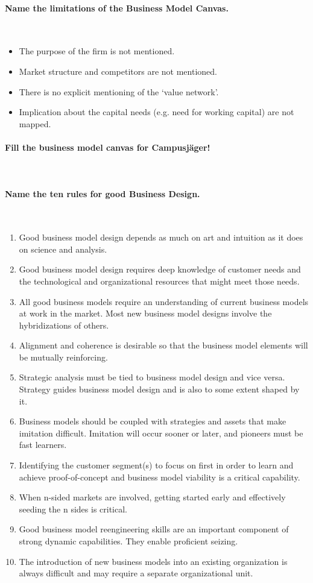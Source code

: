 \documentclass[10pt,a4paper,noendnumber=true]{scrartcl}
\newcommand{\properparagraph}[1]{\paragraph{\textcolor{Emerald}{#1}}\mbox{}\\}
\begin{document}
\properparagraph{Name the limitations of the Business Model Canvas.}
\begin{itemize}
	\item The purpose of the firm is not mentioned.
	\item Market structure and competitors are not mentioned.
	\item There is no explicit mentioning of the ‘value network’.
	\item Implication about the capital needs (e.g. need for working capital) are not mapped.
\end{itemize}

\properparagraph{Fill the business model canvas for Campusjäger!}

\properparagraph{Name the ten rules for good Business Design.}
\begin{enumerate}
	\item  Good business model design depends as much on art and intuition as it does on science
	and analysis.
	\item Good business model design requires deep knowledge of customer needs and the
	technological and organizational resources that might meet those needs.
	\item All good business models require an understanding of current business models at work in
	the market. Most new business model designs involve the hybridizations of others.
	\item Alignment and coherence is desirable so that the business model elements will be
	mutually reinforcing.
	\item Strategic analysis must be tied to business model design and vice versa. Strategy guides
	business model design and is also to some extent shaped by it.
	\item Business models should be coupled with strategies and assets that make imitation
	difficult. Imitation will occur sooner or later, and pioneers must be fast learners.
	\item Identifying the customer segment(s) to focus on first in order to learn and achieve
	proof-of-concept and business model viability is a critical capability.
	\item When n-sided markets are involved, getting started early and effectively seeding the
	n sides is critical.
	\item Good business model reengineering skills are an important component of strong
	dynamic capabilities. They enable proficient seizing.
	\item The introduction of new business models into an existing organization is always
	difficult and may require a separate organizational unit.	
\end{enumerate}
\end{document}
